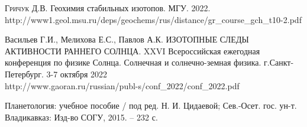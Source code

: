\documentclass[a5paper,openany]{book}
\begin{document}
\begin{thebibliography}{99}
	 \textsc{Гричук Д.В.} Геохимия стабильных изотопов. МГУ. 2022.
	http://www1.geol.msu.ru/deps/geochems/rus/distance/gr\_course\_gch\_t10-2.pdf
		
		
		Васильев Г.И., Мелихова Е.С., Павлов А.К. ИЗОТОПНЫЕ СЛЕДЫ АКТИВНОСТИ РАННЕГО СОЛНЦА. XXVI Всероссийская ежегодная конференция по физике Солнца. Солнечная и солнечно-земная физика. г.Санкт-Петербург. 3-7 октября 2022 \\
		http://www.gaoran.ru/russian/publ-s/conf\_2022/conf\_2022.pdf
		
		Планетология: учебное пособие / под ред. Н. И. Цидаевой;
		Сев.-Осет. гос. ун-т. Владикавказ: Изд-во СОГУ, 2015. – 232 с.







		
		

\end{thebibliography}
\end{document}
